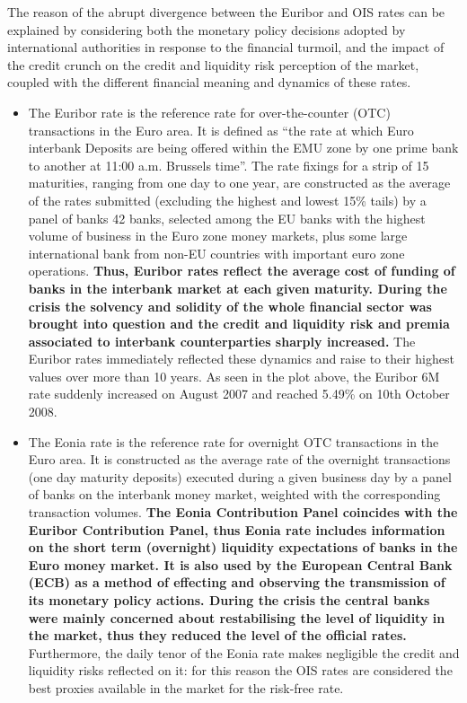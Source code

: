 \documentclass[11pt]{article}
\providecommand{\tightlist}{%
      \setlength{\itemsep}{0pt}\setlength{\parskip}{0pt}}
\begin{document}
The reason of the abrupt divergence between the Euribor and OIS rates
can be explained by considering both the monetary policy decisions
adopted by international authorities in response to the financial
turmoil, and the impact of the credit crunch on the credit and liquidity
risk perception of the market, coupled with the different financial
meaning and dynamics of these rates.

\begin{itemize}
\tightlist
\item
  The Euribor rate is the reference rate for over-the-counter (OTC)
  transactions in the Euro area. It is defined as ``the rate at which
  Euro interbank Deposits are being offered within the EMU zone by one
  prime bank to another at 11:00 a.m. Brussels time''. The rate fixings
  for a strip of 15 maturities, ranging from one day to one year, are
  constructed as the average of the rates submitted (excluding the
  highest and lowest 15\% tails) by a panel of banks 42 banks, selected
  among the EU banks with the highest volume of business in the Euro
  zone money markets, plus some large international bank from non-EU
  countries with important euro zone operations. \textbf{Thus, Euribor
  rates reflect the average cost of funding of banks in the interbank
  market at each given maturity. During the crisis the solvency and
  solidity of the whole financial sector was brought into question and
  the credit and liquidity risk and premia associated to interbank
  counterparties sharply increased.} The Euribor rates immediately
  reflected these dynamics and raise to their highest values over more
  than 10 years. As seen in the plot above, the Euribor 6M rate suddenly
  increased on August 2007 and reached 5.49\% on 10th October 2008.
\item
  The Eonia rate is the reference rate for overnight OTC transactions in
  the Euro area. It is constructed as the average rate of the overnight
  transactions (one day maturity deposits) executed during a given
  business day by a panel of banks on the interbank money market,
  weighted with the corresponding transaction volumes. \textbf{The Eonia
  Contribution Panel coincides with the Euribor Contribution Panel, thus
  Eonia rate includes information on the short term (overnight)
  liquidity expectations of banks in the Euro money market. It is also
  used by the European Central Bank (ECB) as a method of effecting and
  observing the transmission of its monetary policy actions. During the
  crisis the central banks were mainly concerned about restabilising the
  level of liquidity in the market, thus they reduced the level of the
  official rates.} Furthermore, the daily tenor of the Eonia rate makes
  negligible the credit and liquidity risks reflected on it: for this
  reason the OIS rates are considered the best proxies available in the
  market for the risk-free rate.
\end{itemize}
\end{document}
